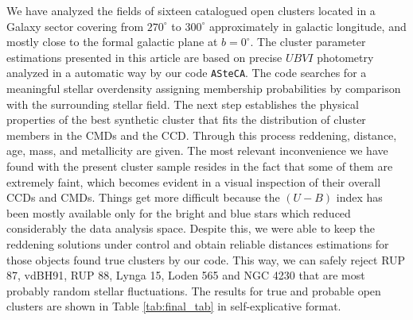 \documentclass[draft]{aa}
\begin{document}
We have analyzed the fields of sixteen catalogued open clusters located in a
Galaxy sector covering from $270^\circ$ to $300^\circ$ approximately in
galactic longitude, and mostly close to the formal galactic plane at
$b=0^\circ$.
The cluster parameter estimations presented in this article are based on
precise $UBVI$ photometry analyzed in a automatic way by our code 
\texttt{ASteCA}. The code searches for a meaningful stellar overdensity
assigning membership probabilities by comparison with the surrounding stellar
field.
The next step establishes the physical properties of the best synthetic cluster
that fits the distribution of cluster members in the CMDs and the CCD.
Through this process reddening, distance, age, mass, and metallicity are
given.
The most relevant inconvenience we have found with the present cluster
sample resides in the fact that some of them are extremely faint, which
becomes evident in a visual inspection of their overall CCDs and CMDs.
Things get more difficult because the $(U-B)$ index has been mostly available
only for the bright and blue stars which reduced considerably the data analysis
space. Despite this, we were able to keep the reddening solutions under control
and obtain reliable distances estimations for those objects found true clusters
by our code. This way, we can safely reject RUP 87, vdBH91, RUP 88, Lynga 15,
Loden 565 and NGC 4230 that are most probably random stellar fluctuations. The
results for true and probable open clusters are shown in Table 
\ref{tab:final_tab} in self-explicative format.
\end{document}
